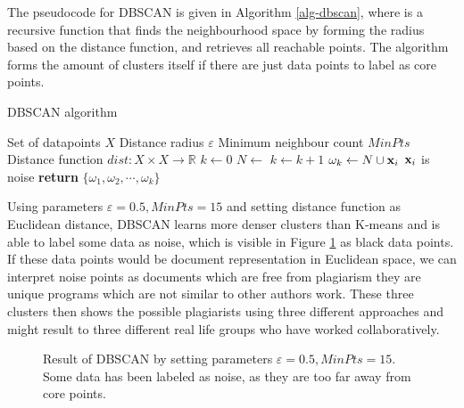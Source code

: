 The pseudocode for DBSCAN is given in Algorithm \ref{alg-dbscan}, where  is a recursive function that finds the neighbourhood space by forming the radius based on the distance function, and retrieves all reachable points. The algorithm forms the amount of clusters itself if there are just data points to label as core points.

\begin{algorithm}[ht]
\caption{DBSCAN algorithm \cite{Ester:1996:DAD:3001460.3001507, Schubert:2017:DRR:3129336.3068335}}
\label{alg-dbscan}
\begin{algorithmic}

\Require Set of datapoints $X$
\Require Distance radius $\varepsilon$
\Require Minimum neighbour count $MinPts$
\Require Distance function $dist: X \times X \rightarrow \mathbb{R}$
   \State $k \gets 0$
    \State $N \gets $ 
        \State $k \gets k + 1$
        \State $\omega_k \gets N \cup \mathbf{x}_i$
    \Else
        \State $\mathbf{x}_i$ is noise
    \EndIf
   \EndFor
   \State \textbf{return} $\{\omega_1, \omega_2, \cdots, \omega_k\}$
\EndProcedure

\end{algorithmic}
\end{algorithm}


Using parameters $\varepsilon = 0.5, MinPts = 15$ and setting distance function as Euclidean distance, DBSCAN learns more denser clusters than K-means and is able to label some data as noise, which is visible in Figure \ref{fig-dbscan-example} as black data points. If these data points would be document representation in Euclidean space, we can interpret noise points as documents which are free from plagiarism \ie they are unique programs which are not similar to other authors work. These three clusters then shows the possible plagiarists using three different approaches and might result to three different real life groups who have worked collaboratively. 

\begin{figure}[ht]
\centering
\setlength\figureheight{7cm}
\setlength\figurewidth{7cm}

\caption{Result of DBSCAN by setting parameters $\varepsilon = 0.5, MinPts = 15$. Some data has been labeled as noise, as they are too far away from core points.} \label{fig-dbscan-example}
\end{figure}

